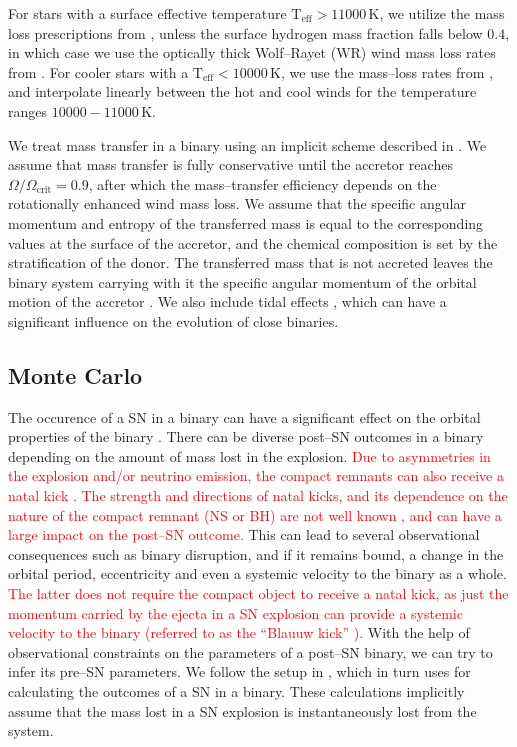 \documentclass[linenumbers,trackchanges,twocolumn]{aastex701}
\newcommand{\red}{\textcolor{red}}
\begin{document}
For stars with a surface effective temperature $\mathrm{T_{eff}} > 11000\,\mathrm{K}$, we utilize the mass loss prescriptions from \citep{2023A&A...676A.109B}, unless the surface hydrogen mass fraction falls below $0.4$, in which case we use the optically thick Wolf--Rayet (WR) wind mass loss rates from \citep{2000A&A...360..227N}. For cooler stars with a $\mathrm{T_{eff}} < 10000\,\mathrm{K}$, we use the mass--loss rates from \citep{2024A&A...681A..17D}, and interpolate linearly between the hot and cool winds for the temperature ranges $10000-11000\,\mathrm{K}$.

We treat mass transfer in a binary using an implicit scheme described in \citep{1990A&A...236..385K}. We assume that mass transfer is fully conservative until the accretor reaches $\Omega/\Omega_{\mathrm{crit}} = 0.9$, after which the mass--transfer efficiency depends on the rotationally enhanced wind mass loss. We assume that the specific angular momentum and entropy of the transferred mass is equal to the corresponding values at the surface of the accretor, and the chemical composition is set by the stratification of the donor. The transferred mass that is not accreted leaves the binary system carrying with it the specific angular momentum of the orbital motion of the accretor \citep{1997A&A...327..620S,2017MNRAS.471.4256V}. We also include tidal effects \citep{1977A&A....57..383Z, 1981A&A....99..126H,2002MNRAS.329..897H}, which can have a significant influence on the evolution of close binaries.

\subsection{Monte Carlo}

The occurence of a SN in a binary can have a significant effect on the orbital properties of the binary \red{\citep{1994astro.ph.12023B,2025OJAp....8E..85W}}. There can be diverse post--SN outcomes in a binary depending on the amount of mass lost in the explosion. \red{Due to asymmetries in the explosion and/or neutrino emission, the compact remnants can also receive a natal kick \citep{2012ARNPS..62..407J,2017ApJ...837...84J}. The strength and directions of natal kicks, and its dependence on the nature of the compact remnant (NS or BH) are not well known \citep{2005MNRAS.360..974H, 2025PASP..137c4203N}, and can have a large impact on the post--SN outcome.} This can lead to several observational consequences such as binary disruption, and if it remains bound, a change in the orbital period, eccentricity and even a systemic velocity to the binary as a whole. \red{The latter does not require the compact object to receive a natal kick, as just the momentum carried by the ejecta in a SN explosion can provide a systemic velocity to the binary (referred to as the ``Blauuw kick'' \cite{1961BAN....15..265B}).} With the help of observational constraints on the parameters of a post--SN binary, we can try to infer its pre--SN parameters. We follow the setup in \citep{2024OJAp....7E..38E}, which in turn uses \citep{1994astro.ph.12023B} for calculating the outcomes of a SN in a binary. These calculations implicitly assume that the mass lost in a SN explosion is instantaneously lost from the system.
\end{document}
